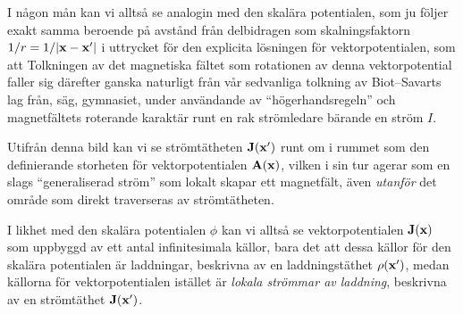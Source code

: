 {{{I n{\aa}gon m{\aa}n kan vi allts{\aa} se analogin med den skal{\"a}ra
potentialen, som ju f{\"o}ljer exakt samma beroende p{\aa} avst{\aa}nd
fr{\aa}n delbidragen som skalningsfaktorn $1/r=1/|{\bf x}-{\bf x}'|$ i
uttrycket f{\"o}r den explicita l{\"o}sningen f{\"o}r vektorpotentialen,
som att
\medskip
{}
\medskip\noindent
Tolkningen av det magnetiska f{\"a}ltet som rotationen av denna vektorpotential
faller sig d{\"a}refter ganska naturligt fr{\aa}n v{\aa}r sedvanliga tolkning
av Biot--Savarts lag fr{\aa}n, s{\"a}g, gymnasiet, under anv{\"a}ndande av
``h{\"o}gerhandsregeln'' och magnetf{\"a}ltets roterande karakt{\"a}r runt en
rak str{\"o}mledare b{\"a}rande en str{\"o}m $I$.

Utifr{\aa}n denna bild kan vi se str{\"o}mt{\"a}theten ${\bf J}({\bf x}')$
runt om i rummet som den definierande storheten f{\"o}r vektorpotentialen
${\bf A}({\bf x})$, vilken i sin tur agerar som en slags ``generaliserad
str{\"o}m'' som lokalt skapar ett magnetf{\"a}lt, {\"a}ven {\it utanf{\"o}r}
det omr{\aa}de som direkt traverseras av str{\"o}mt{\"a}theten.

I likhet med den skal{\"a}ra potentialen $\phi$ kan vi allts{\aa} se
vektorpotentialen ${\bf J}({\bf x})$ som uppbyggd av ett antal infinitesimala
k{\"a}llor, bara det att dessa k{\"a}llor f{\"o}r den skal{\"a}ra potentialen
{\"a}r laddningar, beskrivna av en laddningst{\"a}thet $\rho({\bf x}')$, medan
k{\"a}llorna f{\"o}r vektorpotentialen ist{\"a}llet {\"a}r {\it lokala
str{\"o}mmar av laddning}, beskrivna av en str{\"o}mt{\"a}thet ${\bf J}({\bf x}')$.
\vfill\eject

}}}
